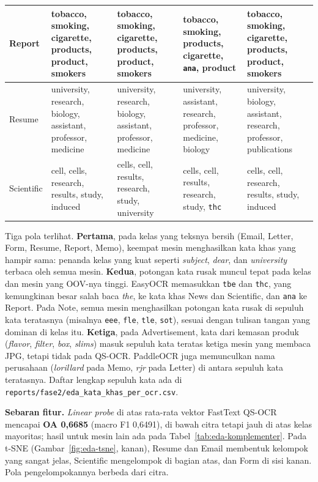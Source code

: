 \begin{table}[H]
\begin{tabularx}{\textwidth}{|l|>{\raggedright\arraybackslash}X|>{\raggedright\arraybackslash}X|>{\raggedright\arraybackslash}X|>{\raggedright\arraybackslash}X|}
    Report & tobacco, smoking, cigarette, products, product, smokers &
    tobacco, smoking, cigarette, products, product, smokers &
    tobacco, smoking, products, cigarette, \texttt{ana}, product &
    tobacco, smoking, cigarette, products, product, smokers \\ \hline
    Resume & university, research, biology, assistant, professor, medicine &
    university, research, biology, assistant, professor, medicine &
    university, assistant, research, professor, medicine, biology &
    university, biology, assistant, research, professor, publications \\ \hline
    Scientific & cell, cells, research, results, study, induced &
    cells, cell, results, research, study, university &
    cells, cell, results, research, study, \texttt{thc} &
    cells, cell, research, results, study, induced \\ \hline
  \end{tabularx}
\end{table}

Tiga pola terlihat. \textbf{Pertama}, pada kelas yang teksnya bersih (Email, Letter,
Form, Resume, Report, Memo), keempat mesin menghasilkan kata khas yang hampir sama:
penanda kelas yang kuat seperti \textit{subject}, \textit{dear}, dan \textit{university}
terbaca oleh semua mesin. \textbf{Kedua}, potongan kata rusak muncul tepat pada kelas dan mesin yang OOV-nya tinggi.
EasyOCR memasukkan \texttt{tbe} dan \texttt{thc}, yang kemungkinan besar salah baca
\textit{the}, ke kata khas News dan Scientific, dan \texttt{ana} ke Report. Pada Note, semua mesin menghasilkan potongan
kata rusak di sepuluh kata teratasnya (misalnya \texttt{eee}, \texttt{fle},
\texttt{tle}, \texttt{sot}), sesuai dengan tulisan tangan yang dominan di kelas itu.
\textbf{Ketiga}, pada Advertisement, kata dari kemasan produk (\textit{flavor},
\textit{filter}, \textit{box}, \textit{slims}) masuk sepuluh kata teratas ketiga mesin
yang membaca JPG, tetapi tidak pada QS-OCR. PaddleOCR juga memunculkan nama perusahaan
(\textit{lorillard} pada Memo, \textit{rjr} pada Letter) di antara sepuluh kata
teratasnya. Daftar lengkap
sepuluh kata ada di \texttt{reports/fase2/eda\_kata\_khas\_per\_ocr.csv}.

\textbf{Sebaran fitur.} \textit{Linear probe} di atas rata-rata vektor FastText QS-OCR
mencapai \textbf{OA 0,6685} (macro F1 0,6491), di bawah citra tetapi jauh di atas kelas
mayoritas; hasil untuk mesin lain ada pada Tabel~\ref{tab:eda-komplementer}. Pada t-SNE
(Gambar~\ref{fig:eda-tsne}, kanan), Resume dan Email membentuk kelompok yang sangat jelas,
Scientific mengelompok di bagian atas, dan Form di sisi kanan. Pola pengelompokannya
berbeda dari citra.

